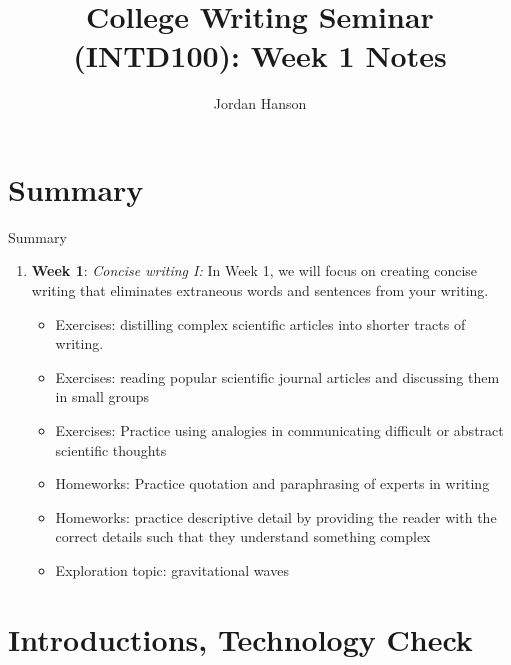 \documentclass{beamer}
\title{College Writing Seminar (INTD100): Week 1 Notes}
\author{Jordan Hanson}
\institute{Whittier College Department of Physics and Astronomy}
\begin{document}
\maketitle

\section{Summary}

\begin{frame}{Summary}
\begin{enumerate}
\item \textbf{Week 1}: \textit{Concise writing I:} In Week 1, we will focus on creating concise writing that eliminates extraneous words and sentences from your writing.
\begin{itemize}
\item Exercises: distilling complex scientific articles into shorter tracts of writing.
\item Exercises: reading popular scientific journal articles and discussing them in small groups
\item Exercises: Practice using analogies in communicating difficult or abstract scientific thoughts
\item Homeworks: Practice quotation and paraphrasing of experts in writing
\item Homeworks: practice descriptive detail by providing the reader with the correct details such that they understand something complex
\item Exploration topic: gravitational waves
\end{itemize}
\end{enumerate}
\end{frame}

\section{Introductions, Technology Check}
\end{document}

